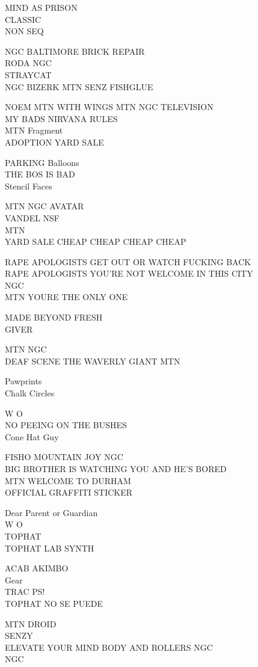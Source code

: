 \documentclass[10pt,letterpaper]{article}
\begin{document}
MIND AS PRISON\\
CLASSIC\\
NON SEQ

NGC BALTIMORE BRICK REPAIR\\
RODA NGC\\
STRAYCAT\\
NGC BIZERK MTN SENZ FISHGLUE

NOEM MTN WITH WINGS MTN NGC TELEVISION\\
MY BADS NIRVANA RULES\\
MTN Fragment\\
ADOPTION YARD SALE

PARKING Balloons\\
THE BOS IS BAD\\
Stencil Faces

MTN NGC AVATAR\\
VANDEL NSF\\
MTN\\
YARD SALE CHEAP CHEAP CHEAP CHEAP

RAPE APOLOGISTS GET OUT OR WATCH FUCKING BACK\\
RAPE APOLOGISTS YOU'RE NOT WELCOME IN THIS CITY\\
NGC\\
MTN YOURE THE ONLY ONE

MADE BEYOND FRESH\\
GIVER

MTN NGC\\
DEAF SCENE THE WAVERLY GIANT MTN

Pawprints\\
Chalk Circles

W O\\
NO PEEING ON THE BUSHES\\
Cone Hat Guy

FISHO MOUNTAIN JOY NGC\\
BIG BROTHER IS WATCHING YOU AND HE'S BORED\\
MTN WELCOME TO DURHAM\\
OFFICIAL GRAFFITI STICKER

Dear Parent or Guardian\\
W O\\
TOPHAT\\
TOPHAT LAB SYNTH

ACAB AKIMBO\\
Gear\\
TRAC PS!\\
TOPHAT NO SE PUEDE

MTN DROID\\
SENZY\\
ELEVATE YOUR MIND BODY AND ROLLERS NGC\\
NGC
\end{document}
